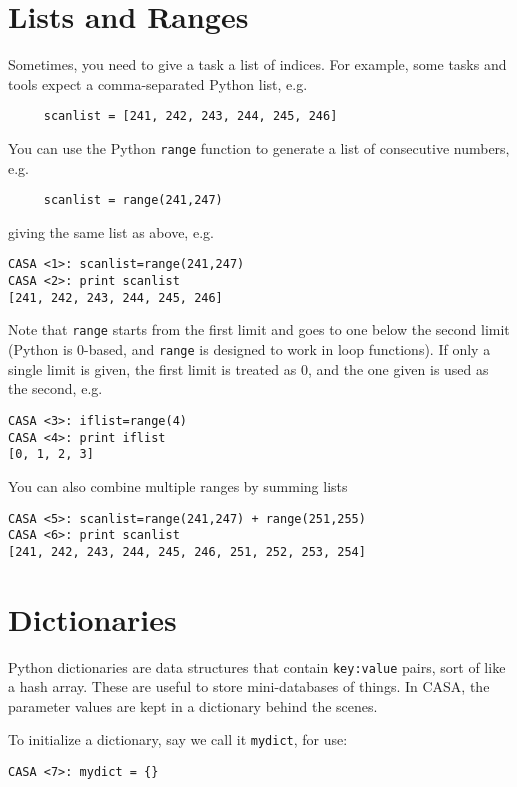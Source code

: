 \section{Lists and Ranges}
\label{section:python.lists}

Sometimes, you need to give a task a list of indices.  For example,
some tasks and tools expect a comma-separated Python list, e.g.
\small
\begin{verbatim}
     scanlist = [241, 242, 243, 244, 245, 246]
\end{verbatim}
\normalsize
You can use the Python {\tt range} function to generate a list of
consecutive numbers, e.g.
\small
\begin{verbatim}
     scanlist = range(241,247)
\end{verbatim}
\normalsize
giving the same list as above, e.g.
\small
\begin{verbatim}
CASA <1>: scanlist=range(241,247)
CASA <2>: print scanlist
[241, 242, 243, 244, 245, 246]
\end{verbatim}
\normalsize
Note that {\tt range} starts from the first limit and goes to
one below the second limit (Python is 0-based, and {\tt range}
is designed to work in loop functions).  If only a single limit
is given, the first limit is treated as 0, and the one given is
used as the second, e.g.
\small
\begin{verbatim}
CASA <3>: iflist=range(4)
CASA <4>: print iflist
[0, 1, 2, 3]
\end{verbatim}
\normalsize
You can also combine multiple ranges by summing lists
\small
\begin{verbatim}
CASA <5>: scanlist=range(241,247) + range(251,255)
CASA <6>: print scanlist
[241, 242, 243, 244, 245, 246, 251, 252, 253, 254]
\end{verbatim}
\normalsize

\section{Dictionaries}
\label{section:python.dict}

Python dictionaries are data structures that contain {\tt key:value}
pairs, sort of like a hash array.  These are useful to store
mini-databases of things.  In CASA, the parameter values are kept
in a dictionary behind the scenes.

To initialize a dictionary, say we call it {\tt mydict}, for use:
\small
\begin{verbatim}
CASA <7>: mydict = {}
\end{verbatim}
\normalsize

